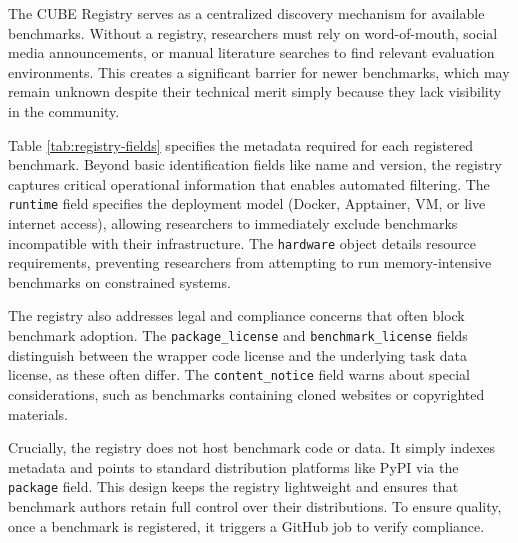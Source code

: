 \documentclass{article}
\theoremstyle{plain}
\theoremstyle{definition}
\theoremstyle{remark}
\begin{document}
The CUBE Registry serves as a centralized discovery mechanism for available benchmarks. Without a registry, researchers must rely on word-of-mouth, social media announcements, or manual literature searches to find relevant evaluation environments. This creates a significant barrier for newer benchmarks, which may remain unknown despite their technical merit simply because they lack visibility in the community.

Table \ref{tab:registry-fields} specifies the metadata required for each registered benchmark. Beyond basic identification fields like name and version, the registry captures critical operational information that enables automated filtering. The \texttt{runtime} field specifies the deployment model (Docker, Apptainer, VM, or live internet access), allowing researchers to immediately exclude benchmarks incompatible with their infrastructure. The \texttt{hardware} object details resource requirements, preventing researchers from attempting to run memory-intensive benchmarks on constrained systems.

The registry also addresses legal and compliance concerns that often block benchmark adoption. The \texttt{package\_license} and \texttt{benchmark\_license} fields distinguish between the wrapper code license and the underlying task data license, as these often differ. The \texttt{content\_notice} field warns about special considerations, such as benchmarks containing cloned websites or copyrighted materials. 

Crucially, the registry does not host benchmark code or data. It simply indexes metadata and points to standard distribution platforms like PyPI via the \texttt{package} field. This design keeps the registry lightweight and ensures that benchmark authors retain full control over their distributions. To ensure quality, once a benchmark is registered, it triggers a GitHub job to verify compliance.
\end{document}
